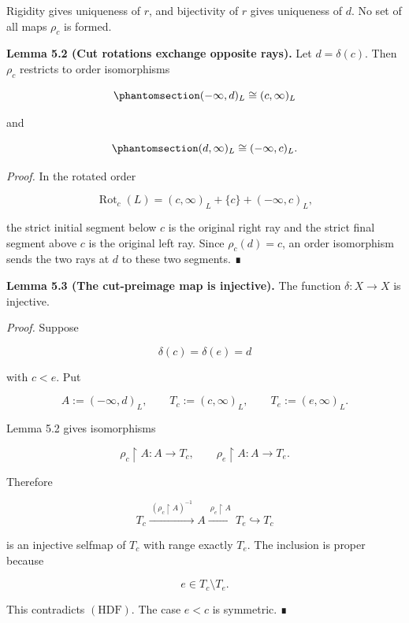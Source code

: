 \documentclass[
  english,
  11pt,
  reqno]{amsart}
\begin{document}
Rigidity gives uniqueness of \(r\), and bijectivity of \(r\) gives
uniqueness of \(d\). No set of all maps \(\rho_c\) is formed.

\protect{}\label{lem:5-2-ray-exchange}

\textbf{Lemma 5.2 (Cut rotations exchange opposite rays).} Let
\(d=\delta(c)\). Then \(\rho_c\) restricts to order isomorphisms

\begin{equation}\protect\phantomsection\label{eq:left-to-right-ray}{
(-\infty,d)_L
\cong
(c,\infty)_L
}\end{equation}

and

\begin{equation}\protect\phantomsection\label{eq:right-to-left-ray}{
(d,\infty)_L
\cong
(-\infty,c)_L.
}\end{equation}

\emph{Proof.} In the rotated order

\[
\operatorname{Rot}_c(L)
=
(c,\infty)_L+\{c\}+(-\infty,c)_L,
\]

the strict initial segment below \(c\) is the original right ray and the
strict final segment above \(c\) is the original left ray. Since
\(\rho_c(d)=c\), an order isomorphism sends the two rays at \(d\) to
these two segments. ∎

\protect{}\label{lem:5-3-delta-injective}

\textbf{Lemma 5.3 (The cut-preimage map is injective).} The function
\(\delta:X\to X\) is injective.

\emph{Proof.} Suppose

\[
\delta(c)=\delta(e)=d
\]

with \(c<e\). Put

\[
A:=(-\infty,d)_L,
\qquad
T_c:=(c,\infty)_L,
\qquad
T_e:=(e,\infty)_L.
\]

Lemma 5.2 gives isomorphisms

\[
\rho_c\upharpoonright A:A\to T_c,
\qquad
\rho_e\upharpoonright A:A\to T_e.
\]

Therefore

\[
T_c
\xrightarrow{\ (\rho_c\upharpoonright A)^{-1}\ }
A
\xrightarrow{\ \rho_e\upharpoonright A\ }
T_e
\hookrightarrow
T_c
\]

is an injective selfmap of \(T_c\) with range exactly \(T_e\). The
inclusion is proper because

\[
e\in T_c\setminus T_e.
\]

This contradicts \((\mathrm{HDF})\). The case \(e<c\) is symmetric. ∎
\end{document}
